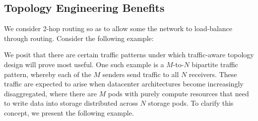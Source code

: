 \documentclass[sigconf]{acmart}
\theoremstyle{definition}
\begin{document}
\begin{appendices}
\subsection{Topology Engineering Benefits}
We consider 2-hop routing so as to allow some the network to load-balance through routing. Consider the following example:


We posit that there are certain traffic patterns under which traffic-aware topology design will prove most useful. One such example is a $M$-to-$N$ bipartite traffic pattern, whereby each of the $M$ senders send traffic to all $N$ receivers. These traffic are expected to arise when datacenter architectures become increasingly disaggregated, where there are $M$ pods with purely compute resources that need to write data into storage distributed across $N$ storage pods. To clarify this concept, we present the following example.


\end{appendices}
\end{document}
